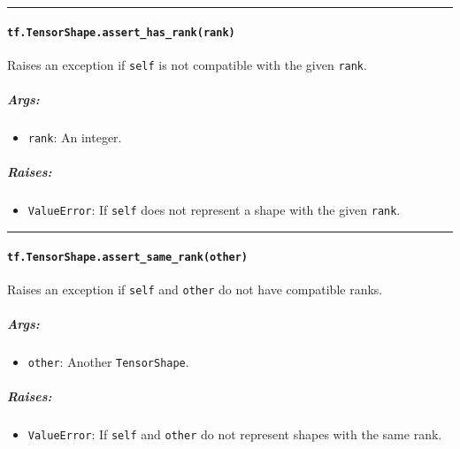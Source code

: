 \begin{center}\rule{0.5\linewidth}{\linethickness}\end{center}

\paragraph{\texorpdfstring{\lstinline{tf.TensorShape.assert_has_rank(rank)}
}{tf.TensorShape.assert_has_rank(rank) }}\label{tf.tensorshape.assertux5fhasux5frankrank}

Raises an exception if \lstinline{self} is not compatible with the given
\lstinline{rank}.

\subparagraph{Args: }\label{args-36}

\begin{itemize}
\tightlist
\item
  \lstinline{rank}: An integer.
\end{itemize}

\subparagraph{Raises: }\label{raises-21}

\begin{itemize}
\tightlist
\item
  \lstinline{ValueError}: If \lstinline{self} does not represent a shape with
  the given \lstinline{rank}.
\end{itemize}

\begin{center}\rule{0.5\linewidth}{\linethickness}\end{center}

\paragraph{\texorpdfstring{\lstinline{tf.TensorShape.assert_same_rank(other)}
}{tf.TensorShape.assert_same_rank(other) }}\label{tf.tensorshape.assertux5fsameux5frankother}

Raises an exception if \lstinline{self} and \lstinline{other} do not have
compatible ranks.

\subparagraph{Args: }\label{args-37}

\begin{itemize}
\tightlist
\item
  \lstinline{other}: Another \lstinline{TensorShape}.
\end{itemize}

\subparagraph{Raises: }\label{raises-22}

\begin{itemize}
\tightlist
\item
  \lstinline{ValueError}: If \lstinline{self} and \lstinline{other} do not
  represent shapes with the same rank.
\end{itemize}

